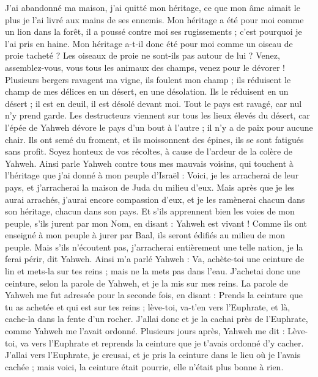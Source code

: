 \begin{multicols}{2}
J'ai abandonné ma maison, j'ai quitté mon héritage, ce que mon âme aimait le plus je l'ai livré aux mains de ses ennemis.
Mon héritage a été pour moi comme un lion dans la forêt, il a poussé contre moi ses rugissements ; c'est pourquoi je l'ai pris en haine.
Mon héritage a-t-il donc été pour moi comme un oiseau de proie tacheté ? Les oiseaux de proie ne sont-ils pas autour de lui ? Venez, assemblez-vous, vous tous les animaux des champs, venez pour le dévorer !
Plusieurs bergers ravagent ma vigne, ils foulent mon champ ; ils réduisent le champ de mes délices en un désert, en une désolation.
Ils le réduisent en un désert ; il est en deuil, il est désolé devant moi. Tout le pays est ravagé, car nul n'y prend garde.
Les destructeurs viennent sur tous les lieux élevés du désert, car l'épée de Yahweh dévore le pays d'un bout à l'autre ; il n'y a de paix pour aucune chair.
Ils ont semé du froment, et ils moissonnent des épines, ils se sont fatigués sans profit. Soyez honteux de vos récoltes, à cause de l'ardeur de la colère de Yahweh.
Ainsi parle Yahweh contre tous mes mauvais voisins, qui touchent à l'héritage que j'ai donné à mon peuple d'Israël : Voici, je les arracherai de leur pays, et j'arracherai la maison de Juda du milieu d'eux.
Mais après que je les aurai arrachés, j'aurai encore compassion d'eux, et je les ramènerai chacun dans son héritage, chacun dans son pays.
Et s'ils apprennent bien les voies de mon peuple, s'ils jurent par mon Nom, en disant : Yahweh est vivant ! Comme ils ont enseigné à mon peuple à jurer par Baal, ils seront édifiés au milieu de mon peuple.
Mais s'ils n'écoutent pas, j'arracherai entièrement une telle nation, je la ferai périr, dit Yahweh.
\VerseOne{}Ainsi m'a parlé Yahweh : Va, achète-toi une ceinture de lin et mets-la sur tes reins ; mais ne la mets pas dans l'eau.
J'achetai donc une ceinture, selon la parole de Yahweh, et je la mis sur mes reins.
La parole de Yahweh me fut adressée pour la seconde fois, en disant :
Prends la ceinture que tu as achetée et qui est sur tes reins ; lève-toi, va-t'en vers l'Euphrate, et là, cache-la dans la fente d'un rocher.
J'allai donc et je la cachai près de l'Euphrate, comme Yahweh me l'avait ordonné.
Plusieurs jours après, Yahweh me dit : Lève-toi, va vers l'Euphrate et reprends la ceinture que je t'avais ordonné d'y cacher.
J'allai vers l'Euphrate, je creusai, et je pris la ceinture dans le lieu où je l'avais cachée ; mais voici, la ceinture était pourrie, elle n'était plus bonne à rien.

\end{multicols}
